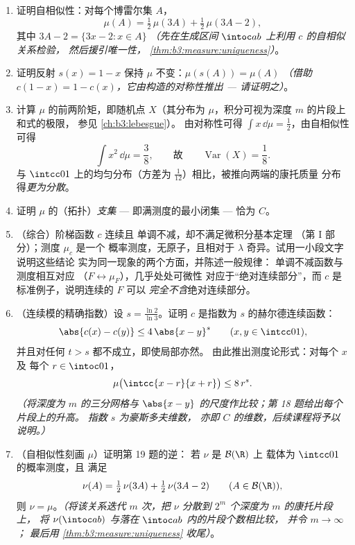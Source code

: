 \begin{problem}
\begin{enumerate}[resume]
  \item 证明自相似性：对每个博雷尔集 $A$，
        \[
        \mu(A) = \tfrac12\,\mu(3A) +
        \tfrac12\,\mu(3A - 2) ,
        \]
        其中 $3A - 2 = \{3x - 2 : x \in A\}$ \emph{（先在生成区间
        $\intoc ab$ 上利用 $c$ 的自相似关系检验，
        然后援引唯一性，
        \cref{thm:b3:measure:uniqueness}）}。
  \item 证明反射 $s(x) = 1 - x$ 保持
        $\mu$ 不变：$\mu(s(A)) = \mu(A)$ \emph{（借助 $c(1 - x) = 1 -
        c(x)$，它由构造的对称性推出
        --- 请证明之）}。
  \item 计算 $\mu$ 的前两阶矩，即随机点 $X$（其分布为
        $\mu$，积分可视为深度 $m$ 的片段上和式的极限，
        参见 \cref{ch:b3:lebesgue}）。
        由对称性可得
        $\int x\,\dd\mu = \frac12$，由自相似性可得
        \[
        \int x^2\,\dd\mu = \frac38,
        \qquad\text{故}\qquad
        \operatorname{Var}(X) = \frac18 .
        \]
        与 $\intcc01$ 上的均匀分布（方差为
        $\frac1{12}$）相比，被推向两端的康托质量
        分布得\emph{更为分散}。
  \item 证明 $\mu$ 的（拓扑）\emph{支集}
        --- 即满测度的最小闭集 --- 恰为
        $C$。
  \item （综合）阶梯函数 $c$ 连续且
        单调不减，却不满足微积分基本定理
        （第 I 部分）；测度 $\mu_c$ 是一个
        概率测度，无原子，且相对于
        $\lambda$ 奇异。试用一小段文字说明这些结论
        实为同一现象的两个方面，并陈述一般规律：
        单调不减函数与测度相互对应
        （$F \leftrightarrow \mu_F$），几乎处处可微性
        对应于“绝对连续部分”，而
        $c$ 是标准例子，说明连续的 $F$ 可以
        \emph{完全不含}绝对连续部分。
  \item （连续模的精确指数）设 $s =
        \frac{\ln 2}{\ln 3}$。证明 $c$ 是指数为 $s$
        的赫尔德连续函数：
        \[
        \abs{c(x) - c(y)} \leq 4\,\abs{x - y}^{s}
        \qquad (x, y \in \intcc01),
        \]
        并且对任何 $t > s$ 都不成立，即使局部亦然。
        由此推出测度论形式：对每个 $x$ 及
        每个 $r \in \intoc01$，
        \[
        \mu\bigl(\intcc{x - r}{x + r}\bigr) \leq 8\,r^{s} .
        \]
        \emph{（将深度为 $m$ 的三分网格与 $\abs{x - y}$
        的尺度作比较；第 18 题给出每个片段上的升高。
        指数 $s$ 为豪斯多夫维数，
        亦即 $C$ 的维数，后续课程将予以说明。）}
  \item （自相似性刻画 $\mu$）证明第 19 题的逆：
        若 $\nu$ 是 $\mathcal B(\R)$ 上
        载体为 $\intcc01$ 的概率测度，且
        满足
        \[
        \nu(A) = \tfrac12\,\nu(3A) + \tfrac12\,\nu(3A - 2)
        \qquad (A \in \mathcal B(\R)),
        \]
        则 $\nu = \mu$。\emph{（将该关系迭代 $m$
        次，把 $\nu$ 分散到 $2^m$ 个深度为 $m$ 的康托片段上，
        将 $\nu(\intoc ab)$ 与落在 $\intoc ab$ 内的片段个数相比较，
        并令 $m \to \infty$；
        最后用 \cref{thm:b3:measure:uniqueness} 收尾）}。
\end{enumerate}
\end{problem}
